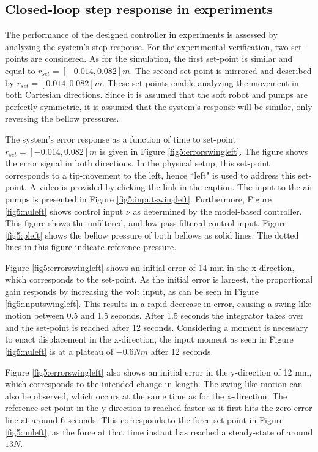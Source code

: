 \subsection*{Closed-loop step response in experiments}


The performance of the designed controller in experiments is assessed by analyzing the system's step response. For the experimental verification, two set-points are considered. As for the simulation, the first set-point is similar and equal to $r_{set} = [-0.014,0.082] m$. The second set-point is mirrored and described by $r_{set} = [0.014,0.082] m$. These set-points enable analyzing the movement in both Cartesian directions. Since it is assumed that the soft robot and pumps are perfectly symmetric, it is assumed that the system's response will be similar, only reversing the bellow pressures.

The system's error response as a function of time to set-point $r_{set} = [-0.014,0.082] m$ is given in Figure \ref{fig5:errorswingleft}. The figure shows the error signal in both directions. In the physical setup, this set-point corresponds to a tip-movement to the left, hence ``left"  is used to address this set-point. A video is provided by clicking the link in the caption. The input to the air pumps is presented in Figure \ref{fig5:inputswingleft}. Furthermore, Figure \ref{fig5:nuleft} shows control input $\nu$ as determined by the model-based controller. This figure shows the unfiltered, and low-pass filtered control input. Figure \ref{fig5:pleft} shows the bellow pressure of both bellows as solid lines. The dotted lines in this figure indicate reference pressure.


Figure \ref{fig5:errorswingleft} shows an initial error of 14 mm in the x-direction, which corresponds to the set-point. As the initial error is largest, the proportional gain responds by increasing the volt input, as can be seen in Figure \ref{fig5:inputswingleft}. This results in a rapid decrease in error, causing a swing-like motion between 0.5 and 1.5 seconds. After 1.5 seconds the integrator takes over and the set-point is reached after 12 seconds. Considering a moment is necessary to enact displacement in the x-direction, the input moment as seen in Figure \ref{fig5:nuleft} is at a plateau of $-0.6 Nm$ after 12 seconds. 

Figure \ref{fig5:errorswingleft} also shows an initial error in the y-direction of 12 mm, which corresponds to the intended change in length. The swing-like motion can also be observed, which occurs at the same time as for the x-direction. The reference set-point in the y-direction is reached faster as it first hits the zero error line at around 6 seconds. This corresponds to the force set-point in Figure \ref{fig5:nuleft}, as the force at that time instant has reached a steady-state of around $13N$. 

